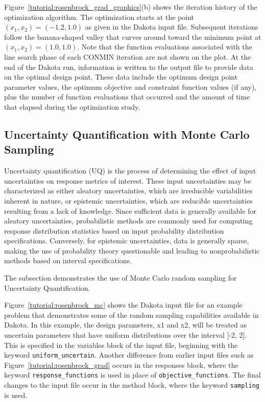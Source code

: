 Figure~\ref{tutorial:rosenbrock_grad_graphics}(b) shows the
iteration history of the optimization algorithm. The optimization
starts at the point $(x_1,x_2) = (-1.2,1.0)$ as given in the
Dakota input file. Subsequent iterations follow the banana-shaped
valley that curves around toward the minimum point at $(x_1,x_2) =
(1.0,1.0)$. Note that the function evaluations associated with the
line search phase of each CONMIN iteration are not shown on the plot.
At the end of the Dakota run, information is written to the output
file to provide data on the optimal design point. These data include
the optimum design point parameter values, the optimum objective and
constraint function values (if any), plus the number of function
evaluations that occurred and the amount of time that elapsed during
the optimization study.

\subsection{Uncertainty Quantification with Monte Carlo Sampling}\label{tutorial:examples:uncert_quant}

Uncertainty quantification (UQ) is the process of determining the
effect of input uncertainties on response metrics of interest. These
input uncertainties may be characterized as either aleatory
uncertainties, which are irreducible variabilities inherent in nature,
or epistemic uncertainties, which are reducible uncertainties
resulting from a lack of knowledge. Since sufficient data is
generally available for aleatory uncertainties, probabilistic methods
are commonly used for computing response distribution statistics based
on input probability distribution specifications. Conversely, for
epistemic uncertainties, data is generally sparse, making the use of
probability theory questionable and leading to nonprobabilistic
methods based on interval specifications.

The subsection demonstrates the use of Monte Carlo random sampling
for Uncertainty Quantification.

Figure~\ref{tutorial:rosenbrock_mc} shows the Dakota input file for
an example problem that demonstrates some of the random sampling
capabilities available in Dakota. In this example, the design
parameters, x1 and x2, will be treated as uncertain parameters that
have uniform distributions over the interval [-2, 2]. This is
specified in the variables block of the input file, beginning with
the keyword \texttt{uniform\_uncertain}.
Another difference from earlier input files such as
Figure~\ref{tutorial:rosenbrock_grad}
occurs in the responses block, where
the keyword \texttt{response\_functions} is used in place of
\texttt{objective\_functions}. The final changes to the input
file occur in the method block, where the keyword
\texttt{sampling} is used.


